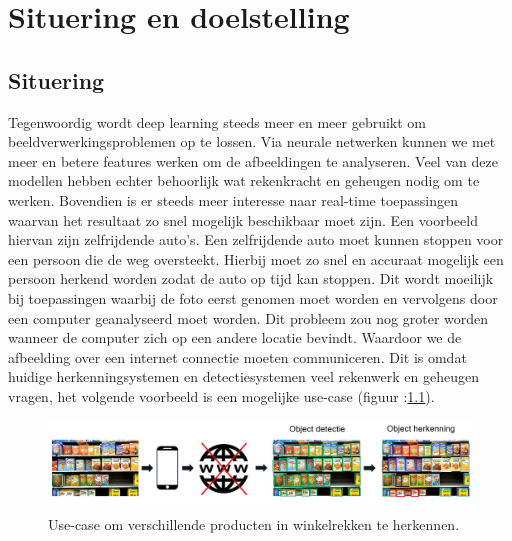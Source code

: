 
\chapter{Situering en doelstelling}

\section{Situering}
Tegenwoordig wordt deep learning steeds meer en meer gebruikt om beeldverwerkingsproblemen op te lossen. 
Via neurale netwerken kunnen we met meer en betere features werken om de afbeeldingen te analyseren. 
Veel van deze modellen hebben echter behoorlijk wat rekenkracht en geheugen nodig om te werken.
Bovendien is er steeds meer interesse naar real-time toepassingen waarvan het resultaat zo snel mogelijk beschikbaar moet zijn.
Een voorbeeld hiervan zijn zelfrijdende auto's.
Een zelfrijdende auto moet kunnen stoppen voor een persoon die de weg oversteekt.
Hierbij moet zo snel en accuraat mogelijk een persoon herkend worden zodat de auto op tijd kan stoppen.
Dit wordt moeilijk bij toepassingen waarbij de foto eerst genomen moet worden en vervolgens door een computer geanalyseerd moet worden.
Dit probleem zou nog groter worden wanneer de computer zich op een andere locatie bevindt.
Waardoor we de afbeelding over een internet connectie moeten communiceren.
Dit is omdat huidige herkenningsystemen en detectiesystemen veel rekenwerk en geheugen vragen, het volgende voorbeeld is een mogelijke use-case (figuur :\ref{fig:use_case}). 

\begin{figure}[!ht]
	\centering
	\includegraphics[width=1.0\linewidth]{fig/situering.jpg}
	\caption{Use-case om verschillende producten in winkelrekken te herkennen.}
	\label{fig:use_case}
\end{figure}

